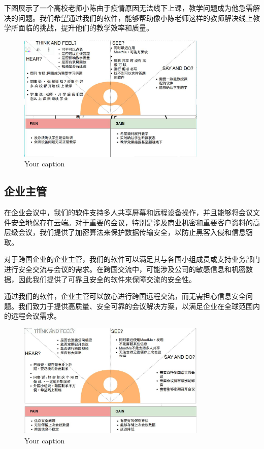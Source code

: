\documentclass[a4paper,12pt]{article}
\begin{document}
    下图展示了一个高校老师小陈由于疫情原因无法线下上课，教学问题成为他急需解决的问题。我们希望通过我们的软件，能够帮助像小陈老师这样的教师解决线上教学所面临的挑战，提升他们的教学效率和质量。
    \begin{figure}[h]
        \centering
        \includegraphics[width=0.8\textwidth]{高校移情图.jpg}
        \caption{Your caption}
    \end{figure}
    \clearpage


    \subsection{企业主管}
    在企业会议中，我们的软件支持多人共享屏幕和远程设备操作，并且能够将会议文件安全地保存在云端。对于重要的会议，特别是涉及商业机密和重要客户资料的高层级会议，我们提供了加密算法来保护数据传输安全，以防止黑客入侵和信息窃取。

    对于跨国企业的企业主管，我们的软件可以满足其与各国小组成员或支持业务部门进行安全交流与会议的需求。在跨国交流中，可能涉及公司的敏感信息和机密数据，因此我们提供了可靠且安全的软件来保障交流的安全性。

    通过我们的软件，企业主管可以放心进行跨国远程交流，而无需担心信息安全问题。我们致力于提供高质量、安全可靠的会议解决方案，以满足企业在全球范围内的远程会议需求。
    \begin{figure}[h]
        \centering
        \includegraphics[width=0.8\textwidth]{企业移情图.jpg}
        \caption{Your caption}
    \end{figure}
    \clearpage
\end{document}
